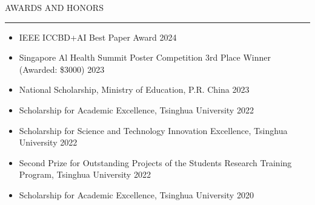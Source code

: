 \documentclass{resume} %
\renewenvironment{rSection}[1]{
\sectionskip
\textcolor{TsinghuaPurple}{\MakeUppercase{#1}}
\sectionlineskip
\hrule
\begin{list}{}{
\setlength{\leftmargin}{0em}
}
\item[]
}{
\end{list}
}
\begin{document}
\begin{rSection}{Awards and Honors}
\begin{itemize}
    \item IEEE ICCBD+AI Best Paper Award \hfill{2024}
    \item Singapore Al Health Summit Poster Competition 3rd Place Winner (Awarded: \$3000) \hfill{2023}
    \item National Scholarship, Ministry of Education, P.R. China \hfill{2023}
    \item Scholarship for Academic Excellence, Tsinghua University \hfill{2022}
    \item Scholarship for Science and Technology Innovation Excellence, Tsinghua University \hfill{2022}
    \item Second Prize for Outstanding Projects of the Students Research Training Program, Tsinghua University \hfill{2022}
    \item Scholarship for Academic Excellence, Tsinghua University \hfill{2020}
\end{itemize}
\end{rSection}
\end{document}
